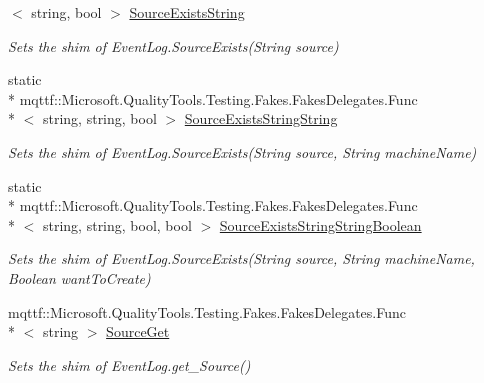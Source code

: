 \begin{DoxyCompactItemize}
$<$ string, bool $>$ \hyperlink{class_system_1_1_diagnostics_1_1_fakes_1_1_shim_event_log_ade021a4084883ada6e6bbeffddb3ee7a}{Source\-Exists\-String}
\begin{DoxyCompactList}\small\item\em Sets the shim of Event\-Log.\-Source\-Exists(\-String source)\end{DoxyCompactList}\item 
static \\*
mqttf\-::\-Microsoft.\-Quality\-Tools.\-Testing.\-Fakes.\-Fakes\-Delegates.\-Func\\*
$<$ string, string, bool $>$ \hyperlink{class_system_1_1_diagnostics_1_1_fakes_1_1_shim_event_log_addd8a9e693b349313ddcf8e2e3bfca42}{Source\-Exists\-String\-String}
\begin{DoxyCompactList}\small\item\em Sets the shim of Event\-Log.\-Source\-Exists(\-String source, String machine\-Name)\end{DoxyCompactList}\item 
static \\*
mqttf\-::\-Microsoft.\-Quality\-Tools.\-Testing.\-Fakes.\-Fakes\-Delegates.\-Func\\*
$<$ string, string, bool, bool $>$ \hyperlink{class_system_1_1_diagnostics_1_1_fakes_1_1_shim_event_log_a4501ba6203bdd0cc83164d901120722d}{Source\-Exists\-String\-String\-Boolean}
\begin{DoxyCompactList}\small\item\em Sets the shim of Event\-Log.\-Source\-Exists(\-String source, String machine\-Name, Boolean want\-To\-Create)\end{DoxyCompactList}\item 
mqttf\-::\-Microsoft.\-Quality\-Tools.\-Testing.\-Fakes.\-Fakes\-Delegates.\-Func\\*
$<$ string $>$ \hyperlink{class_system_1_1_diagnostics_1_1_fakes_1_1_shim_event_log_a110bbb96a35a64c3be628de89387d463}{Source\-Get}
\begin{DoxyCompactList}\small\item\em Sets the shim of Event\-Log.\-get\-\_\-\-Source()\end{DoxyCompactList}\item 

\end{DoxyCompactItemize}
